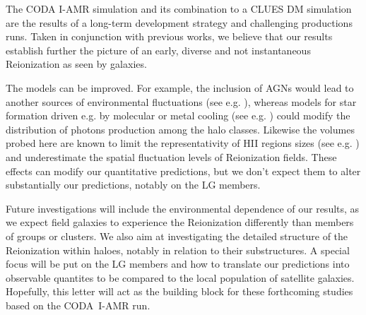 \documentclass[twocolumn]{aastex61}
\begin{document}
The CODA I-AMR simulation and its combination to a CLUES DM simulation are the results of a long-term development strategy and  challenging productions runs. Taken in conjunction with previous works, we believe that our results establish further the picture of an early, diverse and not instantaneous Reionization as seen by galaxies. 

The models can  be improved. For example, the inclusion of AGNs would lead to another sources of environmental fluctuations (see e.g. \citet{CHA15}), whereas models for star formation driven e.g. by molecular or metal cooling (see e.g. \citet{WIS9}) could modify the distribution of photons production among the halo classes. Likewise the volumes probed here are known to limit the representativity of HII regions sizes (see e.g. \citet{ILI6}) and underestimate the spatial fluctuation levels of Reionization fields. These effects can modify our quantitative predictions, but we don't expect them to alter substantially our predictions, notably on the LG members.

Future investigations will include the environmental dependence of our results, as we expect field galaxies to experience the Reionization differently than members of groups or clusters. We also aim at investigating the detailed structure of the Reionization within haloes, notably in relation to their substructures. A special focus will be put on the LG members and how to translate our predictions into observable quantites to be compared to the local population of satellite galaxies. Hopefully, this letter will act as the building block for these forthcoming studies based on the CODA~I-AMR run.


\end{document}
